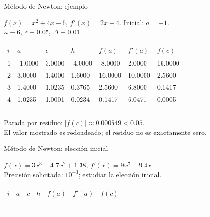 \documentclass[main.tex]{subfiles}
\begin{document}
\begin{frame}[t]{Método de Newton: ejemplo}
\begin{minipage}[t][17mm]{\textwidth}\small
$f(x)=x^2+4x-5$, $f'(x)=2x+4$. Inicial: $a=-1$.\\
$n=6$, $\varepsilon=0.05$, $\Delta=0.01$.
\end{minipage}\begingroup\scriptsize\setlength{\tabcolsep}{2pt}
\begin{center}\begin{tabular}{|C{.04\textwidth}|*{6}{C{.135\textwidth}|}}\hline
$i$&$a$&$c$&$h$&$f(a)$&$f'(a)$&$f(c)$\\\hline
\rule{0pt}{5mm}1&-1.0000&3.0000&-4.0000&-8.0000&2.0000&16.0000\\\hline
\rule{0pt}{5mm}2&3.0000&1.4000&1.6000&16.0000&10.0000&2.5600\\\hline
\rule{0pt}{5mm}3&1.4000&1.0235&0.3765&2.5600&6.8000&0.1417\\\hline
\rule{0pt}{5mm}4&1.0235&1.0001&0.0234&0.1417&6.0471&0.0005\\\hline
\rule{0pt}{5mm}&&&&&&\\\hline
\rule{0pt}{5mm}&&&&&&\\\hline
\end{tabular}\end{center}\endgroup\small Parada por residuo: $|f(c)|\approx0.000549<0.05$.\\El valor mostrado es redondeado; el residuo no es exactamente cero.
\end{frame}
\begin{frame}[t]{Método de Newton: elección inicial}
\begin{minipage}[t][17mm]{\textwidth}\small
$f(x)=3x^3-4.7x^2+1.38$, $f'(x)=9x^2-9.4x$.\\
Precisión solicitada: $10^{-3}$; estudiar la elección inicial.
\end{minipage}\begingroup\scriptsize\setlength{\tabcolsep}{2pt}
\begin{center}\begin{tabular}{|C{.04\textwidth}|*{6}{C{.135\textwidth}|}}\hline
$i$&$a$&$c$&$h$&$f(a)$&$f'(a)$&$f(c)$\\\hline
\rule{0pt}{5mm}&&&&&&\\\hline
\rule{0pt}{5mm}&&&&&&\\\hline
\rule{0pt}{5mm}&&&&&&\\\hline
\rule{0pt}{5mm}&&&&&&\\\hline
\rule{0pt}{5mm}&&&&&&\\\hline
\end{tabular}\end{center}\endgroup
\end{frame}
\end{document}
